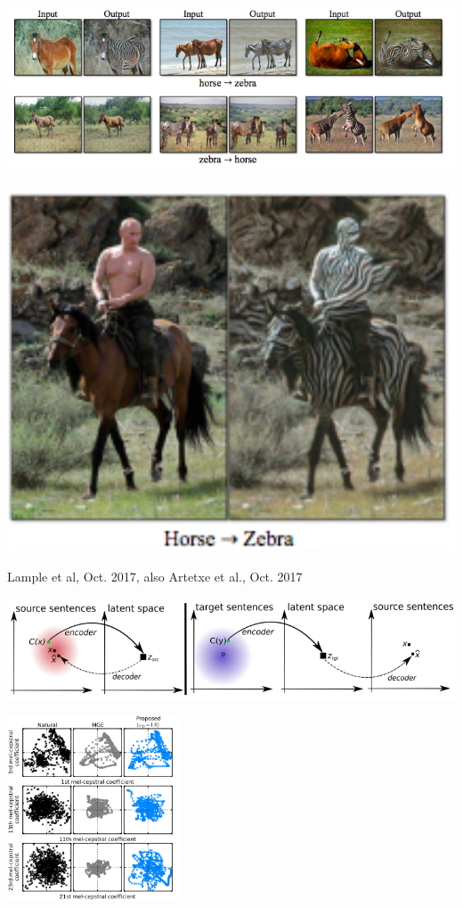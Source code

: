{{

\centerline{\includegraphics[width = 11.0in]{../images/Cycle3}}


\centerline{\includegraphics[width = 6.0in]{../images/Cycle4}}

         {Lample et al, Oct. 2017, also Artetxe et al., Oct. 2017}

\centerline{\includegraphics[width = 10.0in]{../images/Cycle5}}
}


\centerline{\includegraphics[width = 2.0in]{../images/Txt2spchGAN}}

}
